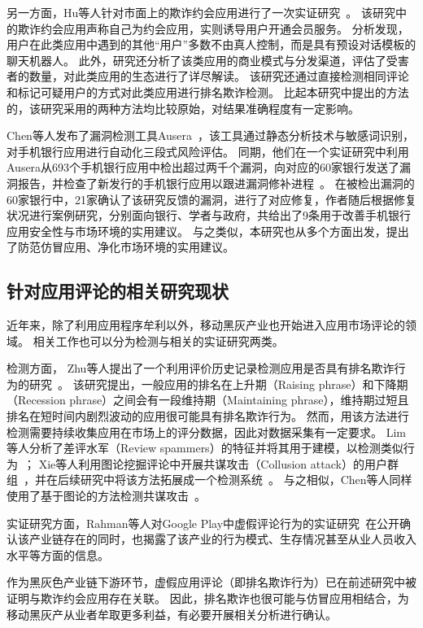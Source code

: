 另一方面，Hu等人针对市面上的欺诈约会应用进行了一次实证研究~\cite{hu2019dating}。
该研究中的欺诈约会应用声称自己为约会应用，实则诱导用户开通会员服务。
分析发现，用户在此类应用中遇到的其他``用户''多数不由真人控制，而是具有预设对话模板的聊天机器人。
此外，研究还分析了该类应用的商业模式与分发渠道，评估了受害者的数量，对此类应用的生态进行了详尽解读。
该研究还通过直接检测相同评论和标记可疑用户的方式对此类应用进行排名欺诈检测。
比起本研究中提出的方法的，该研究采用的两种方法均比较原始，对结果准确程度有一定影响。

Chen等人发布了漏洞检测工具Ausera~\cite{chen2018ausera}，该工具通过静态分析技术与敏感词识别，对手机银行应用进行自动化三段式风险评估。
同期，他们在一个实证研究中利用Ausera从693个手机银行应用中检出超过两千个漏洞，向对应的60家银行发送了漏洞报告，并检查了新发行的手机银行应用以跟进漏洞修补进程~\cite{chen2018mobile}。
在被检出漏洞的60家银行中，21家确认了该研究反馈的漏洞，进行了对应修复，作者随后根据修复状况进行案例研究，分别面向银行、学者与政府，共给出了9条用于改善手机银行应用安全性与市场环境的实用建议。
与之类似，本研究也从多个方面出发，提出了防范仿冒应用、净化市场环境的实用建议。

\subsection{针对应用评论的相关研究现状}
近年来，除了利用应用程序牟利以外，移动黑灰产业也开始进入应用市场评论的领域。
相关工作也可以分为检测与相关的实证研究两类。

检测方面，
Zhu等人提出了一个利用评价历史记录检测应用是否具有排名欺诈行为的研究~\cite{zhu2014discovery}。
该研究提出，一般应用的排名在上升期（Raising phrase）和下降期（Recession phrase）之间会有一段维持期（Maintaining phrase），维持期过短且排名在短时间内剧烈波动的应用很可能具有排名欺诈行为。
然而，用该方法进行检测需要持续收集应用在市场上的评分数据，因此对数据采集有一定要求。
Lim等人分析了差评水军（Review spammers）的特征并将其用于建模，以检测类似行为~\cite{lim2010detecting}；
Xie等人利用图论挖掘评论中开展共谋攻击（Collusion attack）的用户群组~\cite{xie2014grouptie}，并在后续研究中将该方法拓展成一个检测系统~\cite{xie2016you}。
与之相似，Chen等人同样使用了基于图论的方法检测共谋攻击~\cite{chen2017toward}。

实证研究方面，Rahman等人对Google Play中虚假评论行为的实证研究~\cite{rahman2019art}在公开确认该产业链存在的同时，也揭露了该产业的行为模式、生存情况甚至从业人员收入水平等方面的信息。

作为黑灰色产业链下游环节，虚假应用评论（即排名欺诈行为）已在前述研究中被证明与欺诈约会应用存在关联。
因此，排名欺诈也很可能与仿冒应用相结合，为移动黑灰产从业者牟取更多利益，有必要开展相关分析进行确认。

